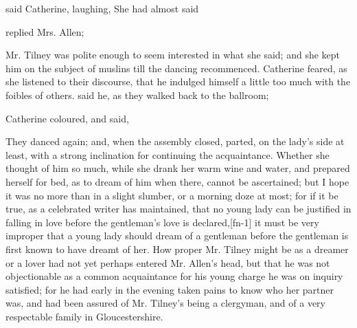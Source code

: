  said Catherine, laughing,  She had almost said 

 replied Mrs. Allen; 



Mr. Tilney was polite enough to seem interested in what she said; and she kept him on the subject of muslins till the dancing recommenced. Catherine feared, as she listened to their discourse, that he indulged himself a little too much with the foibles of others.  said he, as they walked back to the ballroom; 

Catherine coloured, and said, 




They danced again; and, when the assembly closed, parted, on the lady's side at least, with a strong inclination for continuing the acquaintance. Whether she thought of him so much, while she drank her warm wine and water, and prepared herself for bed, as to dream of him when there, cannot be ascertained; but I hope it was no more than in a slight slumber, or a morning doze at most; for if it be true, as a celebrated writer has maintained, that no young lady can be justified in falling in love before the gentleman's love is declared,\goto{\high{{[}1{]}}}[fn-1] it must be very improper that a young lady should dream of a gentleman before the gentleman is first known to have dreamt of her. How proper Mr. Tilney might be as a dreamer or a lover had not yet perhaps entered Mr. Allen's head, but that he was not objectionable as a common acquaintance for his young charge he was on inquiry satisfied; for he had early in the evening taken pains to know who her partner was, and had been assured of Mr. Tilney's being a clergyman, and of a very respectable family in Gloucestershire.

